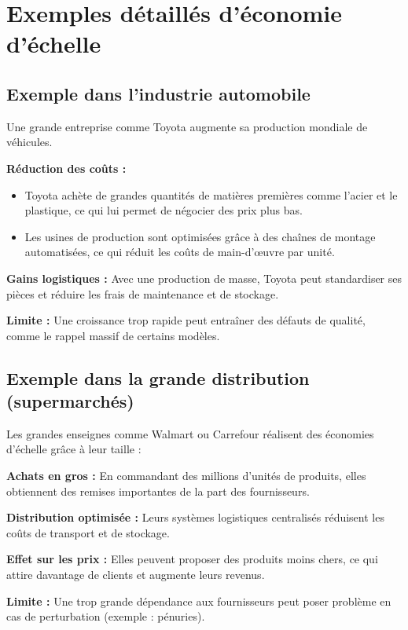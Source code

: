 \chapter*{Exemples détaillés d'économie d'échelle}
\setcounter{chapter}{1}
\setcounter{section}{1}
\section{Exemple dans l’industrie automobile}
Une grande entreprise comme Toyota augmente sa production mondiale de
véhicules.

\textbf{Réduction des coûts :}
\begin{itemize}
  \item Toyota achète de grandes quantités de matières premières comme l’acier et le
        plastique, ce qui lui permet de négocier des prix plus bas.
  \item Les usines de production sont optimisées grâce à des chaînes de montage
        automatisées, ce qui réduit les coûts de main-d'œuvre par unité.
\end{itemize}

\textbf{Gains logistiques :}
Avec une production de masse, Toyota peut standardiser ses pièces et réduire les frais de maintenance et de stockage.

\textbf{Limite :}
Une croissance trop rapide peut entraîner des défauts de qualité, comme le rappel massif de certains modèles.

\section{Exemple dans la grande distribution (supermarchés)}
Les grandes enseignes comme Walmart ou Carrefour réalisent des économies
d’échelle grâce à leur taille :

\textbf{Achats en gros :}
En commandant des millions d’unités de produits, elles obtiennent des remises importantes de la part des fournisseurs.

\textbf{Distribution optimisée :}
Leurs systèmes logistiques centralisés réduisent les coûts de transport et de stockage.

\textbf{Effet sur les prix :}
Elles peuvent proposer des produits moins chers, ce qui attire davantage de clients et augmente leurs revenus.

\textbf{Limite :}
Une trop grande dépendance aux fournisseurs peut poser problème en cas de perturbation (exemple : pénuries).

